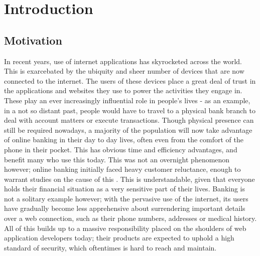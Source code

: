\chapter{Introduction} 

\section{Motivation}

In recent years, use of internet applications has skyrocketed across the world. This is exarcebated by the ubiquity and sheer number of devices that are now connected to the internet. 
The users of these devices place a great deal of trust in the applications and websites they use to power the activities they engage in. 
These play an ever increasingly influential role in people's lives - as an example, in a not so distant past, people would have to travel to a physical bank branch to deal with account matters or execute transactions. Though physical presence can still be required nowadays, a majority of the population will now take advantage of online banking in their day to day lives, often even from the comfort of the phone in their pocket. This has obvious time and efficiency advantages, and benefit many who use this today.
This was not an overnight phenomenon however; online banking initially faced heavy customer reluctance, enough to warrant studies on the cause of this \cite{KUISMA200775}. 
This is understandable, given that everyone holds their financial situation as a very sensitive part of their lives.
Banking is not a solitary example however; with the pervasive use of the internet, its users have gradually become less apprehensive about surrendering important details over a web connection, such as their phone numbers, addresses or medical history.  
All of this builds up to a massive responsibility placed on the shoulders of web application developers today; their products are expected to uphold a high standard of security, which oftentimes is hard to reach and maintain. \\

